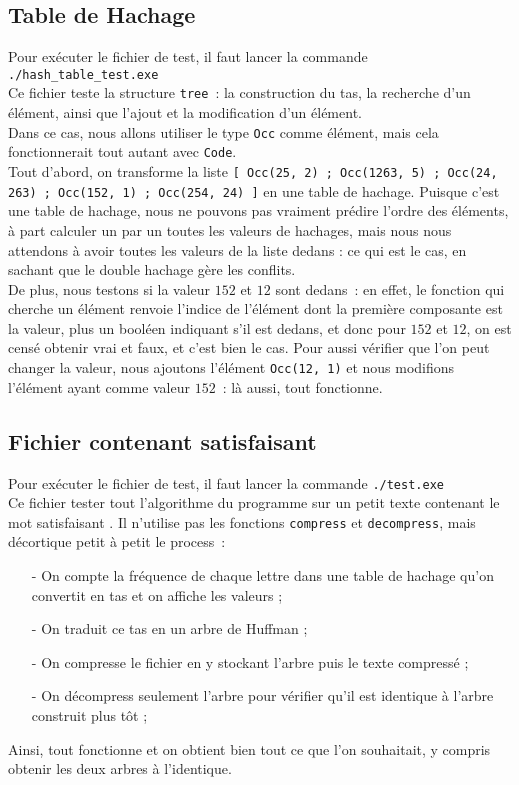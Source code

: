 \documentclass{article}
\begin{document}
  \subsection*{Table de Hachage}
  Pour exécuter le fichier de test, il faut lancer la commande \texttt{./hash\_table\_test.exe} \\
  Ce fichier teste la structure \texttt{tree}~: la construction du tas, la recherche d'un élément, ainsi que l'ajout et la modification d'un élément. \\
  Dans ce cas, nous allons utiliser le type \texttt{Occ} comme élément, mais cela fonctionnerait tout autant avec \texttt{Code}. \\
  Tout d'abord, on transforme la liste \texttt{[ Occ(25, 2) ; Occ(1263, 5) ; Occ(24, 263) ; Occ(152, 1) ; Occ(254, 24) ]} en une table de hachage. Puisque c'est une table de hachage, nous ne pouvons pas vraiment prédire l'ordre des éléments, à part calculer un par un toutes les valeurs de hachages, mais nous nous attendons à avoir toutes les valeurs de la liste dedans : ce qui est le cas, en sachant que le double hachage gère les conflits. \\
  De plus, nous testons si la valeur $152$ et $12$ sont dedans~: en effet, le fonction qui cherche un élément renvoie l'indice de l'élément dont la première composante est la valeur, plus un booléen indiquant s'il est dedans, et donc pour $152$ et $12$, on est censé obtenir vrai et faux, et c'est bien le cas. Pour aussi vérifier que l'on peut changer la valeur, nous ajoutons l'élément \texttt{Occ(12, 1)} et nous modifions l'élément ayant comme valeur $152$~: là aussi, tout fonctionne.

  \subsection*{Fichier contenant \og satisfaisant \fg{}}
  Pour exécuter le fichier de test, il faut lancer la commande \texttt{./test.exe} \\
  Ce fichier tester tout l'algorithme du programme sur un petit texte contenant le mot \og satisfaisant \fg{}. Il n'utilise pas les fonctions \texttt{compress} et \texttt{decompress}, mais décortique petit à petit le process~:
  \begin{itemize}
    \item[-] On compte la fréquence de chaque lettre dans une table de hachage qu'on convertit en tas et on affiche les valeurs ;
    \item[-] On traduit ce tas en un arbre de Huffman ;
    \item[-] On compresse le fichier en y stockant l'arbre puis le texte compressé ;
    \item[-] On décompress seulement l'arbre pour vérifier qu'il est identique à l'arbre construit plus tôt ;
  \end{itemize}
  Ainsi, tout fonctionne et on obtient bien tout ce que l'on souhaitait, y compris obtenir les deux arbres à l'identique.
\end{document}
